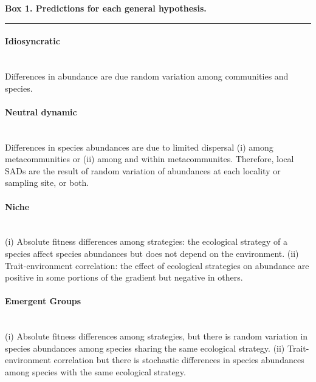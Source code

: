 \documentclass[12pt]{article}
\begin{document}
\begin{mdframed}[style=exampledefault]
\newpage
\begin{singlespacing}
 \textbf{Box 1. Predictions for each general hypothesis.} \\
 \noindent\rule[0.5ex]{\linewidth}{1pt}
  \paragraph{{\color{grey}{$\blacksquare$}} Idiosyncratic} ~\\ Differences in abundance are due random variation among communities and species.
\paragraph{{\color{neutral}{$\blacksquare$}} Neutral dynamic} ~\\ Differences in species abundances are due to limited dispersal (i) among metacommunities or (ii) among and within metacommunites. Therefore, local SADs are the result of random variation of abundances at each locality or sampling site, or both. %
\paragraph{{\color{niche}{$\blacksquare$}} Niche} ~\\ (i) Absolute fitness differences among strategies: the ecological strategy of a species affect species abundances but does not depend on the environment. (ii) Trait-environment correlation: the effect of ecological strategies on abundance are positive in some portions of the gradient but negative in others. 
\paragraph{{\color{nineu}{$\blacksquare$}} Emergent Groups} ~\\ (i) Absolute fitness differences among strategies, but there is random variation in species abundances among species sharing the same ecological strategy. (ii) Trait-environment correlation but there is stochastic differences in species abundances among species with the same ecological strategy.

\end{singlespacing}
\end{mdframed}
\end{document}
